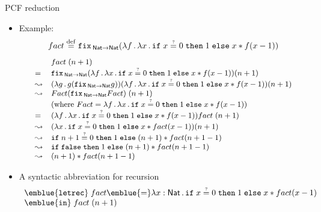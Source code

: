 \documentclass[paper=screen,mode=present,style=zysimple]{powerdot}
\begin{document}
\begin{slide}{PCF reduction}
\begin{itemize}
\item Example:
\vspace*{-0.5em}
$$fact \stackrel{\mathrm{def}}{=}  \mathtt{fix}\,_{\mathsf{Nat} \to \mathsf{Nat}} (\lambda f \, . \, \lambda x \, . \, \mathtt{if} \; {x \stackrel{\mbox{\tiny ?}}{=} 0} \; \mathtt{then} \; {1} \; \mathtt{else} \; {x * f(x-1)}) $$
$$\small
\begin{array}{ll}
& fact \; (n+1) 
\\ = & 
\cfix_{\tnat \to \tnat} (\lambda f \ldot \lambda x \ldot \cif{x \eqtest 0}{1}{x * f(x-1)}) (n+1)
\\ \reduce & 
(\lambda g \ldot g (\cfix_{\tnat \to \tnat} g)) (\lambda f \ldot \lambda x \ldot \cif{x \eqtest 0}{1}{x * f(x-1)}) (n+1)
\\ \reduce & 
Fact (\cfix_{\tnat \to \tnat} Fact) \; (n+1)
\\ & 
\mbox{(where $Fact = \lambda f \ldot \lambda x \ldot \cif{x \eqtest 0}{1}{x * f(x-1)}$)}
\\ = & 
(\lambda f \ldot \lambda x \ldot \cif{x \eqtest 0}{1}{x * f(x-1)}) fact \; (n+1)
\\ \reduce & 
(\lambda x \ldot \cif{x \eqtest 0}{1}{x * fact(x-1)}) (n+1)
\\ \reduce &
\cif{n+1 \eqtest 0}{1}{(n+1) * fact(n+1-1)} 
\\ \reduce &
\cif{\cfalse}{1}{(n+1) * fact(n+1-1)} 
\\ \reduce & 
(n+1) * fact(n+1-1) 
\end{array}
\vspace*{-1em}
$$
\item A syntactic abbreviation for recursion 
\vspace*{-0.8em}
\[
\begin{array}{l}
\emblue{\mathtt{letrec}} \; fact \emblue{=} 
\lambda x : \tnat \ldot \cif{x \eqtest 0}{1}{x * fact(x-1)} \\
\emblue{\mathtt{in}} \; fact \; (n+1)
\end{array}
\]
\end{itemize}
\end{slide}
\end{document}
